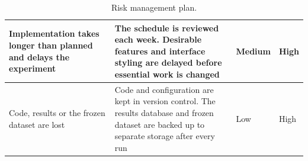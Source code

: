 \documentclass[12pt,a4paper]{article}
\begin{document}
\begin{table}[!htbp]
\begin{tabularx}{\textwidth}{@{}LLll@{}}
        \midrule

        Implementation takes longer than planned and delays the experiment &
        The schedule is reviewed each week. Desirable features and interface
        styling are delayed before essential work is changed &
        Medium &
        High \\

        \midrule

        Code, results or the frozen dataset are lost &
        Code and configuration are kept in version control. The results
        database and frozen dataset are backed up to separate storage after
        every run &
        Low &
        High \\

        \bottomrule
    \end{tabularx}

    \caption{Risk management plan.}
    \label{tab:risks}
\end{table}

\clearpage




\end{document}
